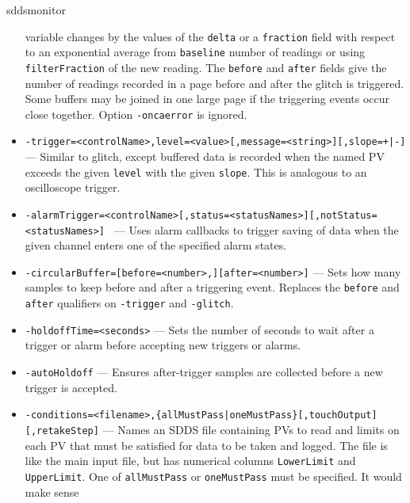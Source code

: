 \begin{sddsprog}{sddsmonitor}
\begin{itemize}
                variable changes by the values of the \verb+delta+ or a \verb+fraction+ field with respect to an exponential
                average from \verb+baseline+ number of readings or using \verb+filterFraction+ of the new reading.
                The \verb+before+ and \verb+after+ fields give the number of readings recorded in a page
                before and after the glitch is triggered. Some buffers may be joined in
                one large page if the triggering events occur close together.
                Option \verb+-oncaerror+ is ignored.
  \item {\tt -trigger=<controlName>,level=<value>[,message=<string>][,slope={+|-}] \newline
[,before=<number>][,after=<number>][,autoArm][,{autoHoldoff|holdoff=<seconds>}]} --- Similar to glitch,
                except buffered data is recorded when the named PV exceeds
                the given \verb+level+ with the given \verb+slope+. This is analogous to an oscilloscope
                trigger.
  \item {\tt -alarmTrigger=<controlName>[,status=<statusNames>][,notStatus=<statusNames>] \newline
                  [,severity=<sevNames>][,notSeverity=<sevNames>][,{autoHoldoff|holdoff=<seconds>}]} ---
                Uses alarm callbacks to trigger saving of data when the given channel enters one
                of the specified alarm states.
  \item {\tt -circularBuffer=[before=<number>,][after=<number>]} --- Sets how many samples to keep before and after
                a triggering event. Replaces the \verb+before+ and \verb+after+ qualifiers on \verb+-trigger+ and \verb+-glitch+.
  \item {\tt -holdoffTime=<seconds>} --- Sets the number of seconds to wait after a trigger or alarm
                before accepting new triggers or alarms.
  \item {\tt -autoHoldoff} --- Ensures after-trigger samples are collected before a new trigger is accepted.
  \item {\verb+-conditions=<filename>,{allMustPass|oneMustPass}[,touchOutput][,retakeStep]+} ---
                Names an SDDS file containing PVs to read and limits on each PV that must
                be satisfied for data to be taken and logged. The file is like the main
                input file, but has numerical columns \verb+LowerLimit+ and \verb+UpperLimit+.
                One of \verb+allMustPass+ or \verb+oneMustPass+ must be specified. It would make sense

\end{itemize}
\end{sddsprog}
